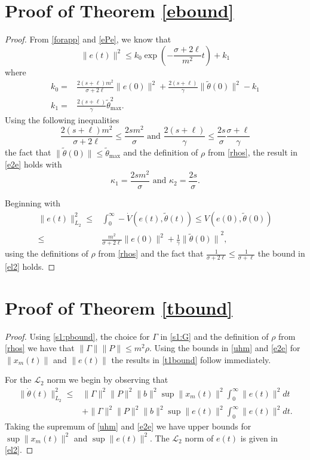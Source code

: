 \documentclass[10pt,journal]{IEEEtran}
\theoremstyle{plain}%
\theoremstyle{definition}
\newcommand{\be}[0]{\begin{equation}}
\newcommand{\ee}[0]{\end{equation}}
\newcommand{\ben}[0]{\begin{equation*}}
\newcommand{\een}[0]{\end{equation*}}
\newcommand{\norms}[1]{\lVert#1\rVert}
\newcommand{\normB}[0]{\norms}
\let\norm=\normB
\newcommand{\norml}[2]{\norm{#1}_{L_{#2}}}
\begin{document}
\section{Proof of Theorem \ref{ebound}}\label{eboundp}
\begin{proof}
From \eqref{forapp} and \eqref{ePe}, we know that
\ben
\norm {e(t)}^2 \leq  k_0 \exp \left(-\frac{\sigma+2\ell}{m^2} t \right) + k_1
\een
where
\be\label{k01}\begin{split}
k_0 =&   \frac{2(s+\ell) m^2 }{\sigma+2\ell}\norm{e(0)}^2 + \frac{2(s+\ell)}{\gamma } \norm{\tilde\theta(0)}^2  - k_1\\
k_1 = & \frac{2(s+\ell)}{\gamma }\tilde\theta_\text{max}^2 .
\end{split}\ee
Using the following inequalities
\begin{equation*}
 \frac{2(s+\ell) m^2 }{\sigma+2\ell}  \leq \frac{2sm^2 }{\sigma} \text{ and }
 \frac{2(s+\ell)}{\gamma} \leq \frac{2s}{\sigma} \frac{\sigma+\ell}{\gamma}
\end{equation*}
the fact that $\norm{\tilde\theta(0)}\leq\tilde \theta_\text{max}$ and the definition of $\rho$ from \eqref{rhos}, the result in \eqref{e2e} holds with
\be
\kappa_1 =   \frac{2sm^2 }{\sigma} \text{ and }
\kappa_2 =  \frac{2s}{\sigma}.
\ee

Beginning with \be\begin{split}\label{elfirst}
\norm{e(t)}_{L_2}^2 \leq & \int_0^\infty - \dot V(e(t),\tilde\theta(t)) \leq V(e(0),\tilde\theta(0)) \\
\leq& \frac{m^2}{\sigma+ 2\ell} \norm{e(0)}^2 + \frac{1}{\gamma}{\norm{\tilde\theta(0)}}^2,
\end{split}\ee using the definitions of $\rho$ from \eqref{rhos} and the fact that
$
\frac{1}{\sigma+ 2\ell} \leq \frac{1}{\sigma + \ell}
$ the bound in \eqref{el2} holds.
\end{proof}

\section{Proof of Theorem \ref{tbound}}\label{tboundp}
\begin{proof}
Using \eqref{s1:pbound}, the choice for $\Gamma$ in \eqref{s1:G} and the definition of $\rho$ from \eqref{rhos} we have that $
\norm \Gamma \norm P \leq m^2 \rho$. Using the bounds in \eqref{uhm} and \eqref{e2e} for $\norm{x_m(t)}$ and $\norm{e(t)}$ the results in \eqref{t1bound} follow immediately.

For the $\mathcal L_2$ norm we begin by observing that
\ben
\begin{split}\label{bp1}
\norml{\dot\theta(t)}{2}^2 \leq &\norm{\Gamma}^2 \norm{P}^2 \norm b^2\sup\norm {x_m(t)}^2 \int_0^\infty\norm {e(t)}^2  dt \\ &+  \norm{\Gamma}^2 \norm{P}^2 \norm b^2 \sup \norm {e(t)}^2 \int_0^\infty\norm {e(t)}^2 dt.
\end{split}
\een
Taking the supremum of \eqref{uhm} and \eqref{e2e} we have upper bounds for $\sup\norm {x_m(t)}^2$ and $\sup\norm {e(t)}^2$. The $\mathcal L_2$ norm of $e(t)$ is given in \eqref{el2}.\end{proof}
\end{document}

